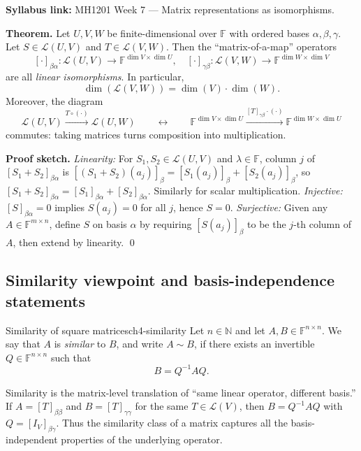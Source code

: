 \begin{extension}[title={Extension (Lecture Week 7): the Fundamental Theorem of Finite-Dimensional Vector Spaces}]
\textbf{Syllabus link:} MH1201 Week 7 --- Matrix representations as isomorphisms.

\textbf{Theorem.} Let $U,V,W$ be finite-dimensional over $\mathbb{F}$ with ordered bases $\alpha,\beta,\gamma$.
Let $S\in\mathcal{L}(U,V)$ and $T\in\mathcal{L}(V,W)$.
Then the ``matrix-of-a-map'' operators
\[
[\cdot]_{\beta\alpha}:\mathcal{L}(U,V)\to\mathbb{F}^{\dim V\times\dim U},\quad
[\cdot]_{\gamma\beta}:\mathcal{L}(V,W)\to\mathbb{F}^{\dim W\times\dim V}
\]
are all \emph{linear isomorphisms}. In particular,
\[
\dim(\mathcal{L}(V,W))=\dim(V)\cdot\dim(W).
\]
Moreover, the diagram
\[
\mathcal{L}(U,V)\xrightarrow{T\circ(\cdot)}\mathcal{L}(U,W)
\qquad\longleftrightarrow\qquad
\mathbb{F}^{\dim V\times\dim U}\xrightarrow{[T]_{\gamma\beta}\cdot(\cdot)}\mathbb{F}^{\dim W\times\dim U}
\]
commutes: taking matrices turns composition into multiplication.

\textbf{Proof sketch.}
\emph{Linearity:} For $S_1,S_2\in\mathcal{L}(U,V)$ and $\lambda\in\mathbb{F}$, column $j$ of $[S_1+S_2]_{\beta\alpha}$ is $[(S_1+S_2)(a_j)]_\beta=[S_1(a_j)]_\beta+[S_2(a_j)]_\beta$, so $[S_1+S_2]_{\beta\alpha}=[S_1]_{\beta\alpha}+[S_2]_{\beta\alpha}$. Similarly for scalar multiplication.
\emph{Injective:} $[S]_{\beta\alpha}=0$ implies $S(a_j)=0$ for all $j$, hence $S=0$.
\emph{Surjective:} Given any $A\in\mathbb{F}^{m\times n}$, define $S$ on basis $\alpha$ by requiring $[S(a_j)]_\beta$ to be the $j$-th column of $A$, then extend by linearity. \qed
\end{extension}

\subsection{Similarity viewpoint and basis-independence statements}

\begin{definition}{Similarity of square matrices}{ch4-similarity}
Let $n\in\mathbb{N}$ and let $A,B\in\mathbb{F}^{n\times n}$.
We say that $A$ is \emph{similar} to $B$, and write $A\sim B$, if there exists an invertible $Q\in\mathbb{F}^{n\times n}$ such that
\[
B=Q^{-1}AQ.
\]
\end{definition}

Similarity is the matrix-level translation of ``same linear operator, different basis.''
If $A=[T]_{\beta\beta}$ and $B=[T]_{\gamma\gamma}$ for the same $T\in\mathcal{L}(V)$, then $B=Q^{-1}AQ$ with $Q=[I_V]_{\beta\gamma}$.
Thus the similarity class of a matrix captures all the basis-independent properties of the underlying operator.

